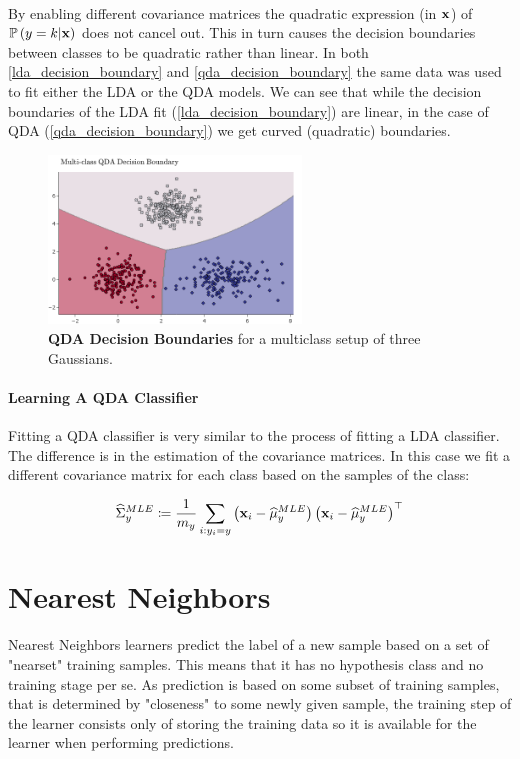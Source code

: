 ~\\By enabling different covariance matrices the quadratic expression (in $\mathbf{x}$) of $\mathbb{P}\left(y=k|\mathbf{x}\right)$ does not cancel out. This in turn causes the decision boundaries between classes to be quadratic rather than linear. In both \autoref{lda_decision_boundary} and \autoref{qda_decision_boundary} the same data was used to fit either the LDA or the QDA models. We can see that while the decision boundaries of the LDA fit (\autoref{lda_decision_boundary}) are linear, in the case of QDA (\autoref{qda_decision_boundary}) we get curved (quadratic) boundaries.

\begin{figure}[h!]
	\centering
	\includegraphics[width=0.6\textwidth]{chapters/classification/figures/qda_decision_boundary.png}
	\caption{\textbf{QDA Decision Boundaries} for a multiclass setup of three Gaussians. \GitChapterThreeExamples}
	\label{qda_decision_boundary}
\end{figure}

\paragraph{Learning A QDA Classifier}
Fitting a QDA classifier is very similar to the process of fitting a LDA classifier. The difference is in the estimation of the covariance matrices. In this case we fit a different covariance matrix for each class based on the samples of the class:

\begin{equation}
\widehat{\Sigma}^{MLE}_y \coloneqq \frac{1}{m_y} \sum_{i:y_i=y}\left(\mathbf{x}_i-\widehat{\mu}_{y}^{MLE}\right)\left(\mathbf{x}_i-\widehat{\mu}_{y}^{MLE}\right)^\top \label{cov_mle}
\end{equation}

\section{Nearest Neighbors}
Nearest Neighbors learners predict the label of a new sample based on a set of "nearset" training samples. This means that it has no hypothesis class and no training stage per se. As prediction is based on some subset of training samples, that is determined by "closeness" to some newly given sample, the training step of the learner consists only of storing the training data so it is available for the learner when performing predictions.

